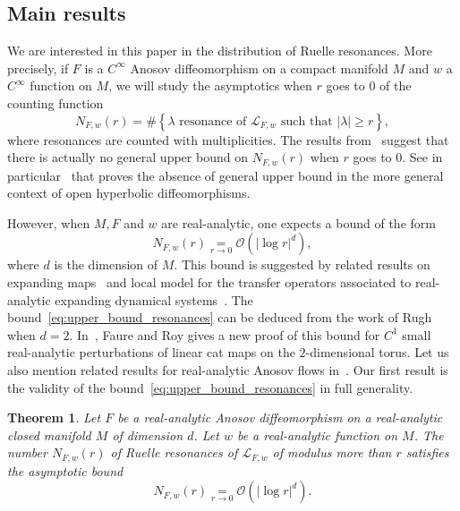 \documentclass[10pt]{amsart}
\newtheorem{theo}{Theorem}[section]
\theoremstyle{definition}\newtheorem{defi}[theo]{Definition}\newtheorem{rema}[theo]{Remark}\newtheorem{exam}[theo]{Example}\newtheorem{exem}[theo]{Example}\newtheorem{nota}[theo]{Notation}
\newcommand{\set}[1]{\left\{ #1 \right\}}
\newcommand{\p}[1]{\left(#1\right)}
\newcommand{\va}[1]{\left|#1\right|}
\newcommand{\clO}{\mathcal{O}}
\newcommand{\clL}{\mathcal{L}}
\begin{document}
\subsection{Main results}

We are interested in this paper in the distribution of Ruelle resonances. More precisely, if $F$ is a $C^\infty$ Anosov diffeomorphism on a compact manifold $M$ and $w$ a $C^\infty$ function on $M$, we will study the asymptotics when $r$ goes to $0$ of the counting function
\begin{equation*}
N_{F,w}(r) = \# \set{ \lambda \text{ resonance of } \clL_{F,w} \text{ such that } \va{\lambda} \geq r},
\end{equation*}
where resonances are counted with multiplicities. The results from~\cite{local_and_global} suggest that there is actually no general upper bound on $N_{F,w}(r)$ when $r$ goes to $0$. See in particular~\cite[Proposition~2.10]{local_and_global} that proves the absence of general upper bound in the more general context of open hyperbolic diffeomorphisms.

However, when $M,F$ and $w$ are real-analytic, one expects a bound of the form
\begin{equation}\label{eq:upper_bound_resonances}
N_{F,w}(r) \underset{r \to 0}{=} \clO\p{\va{\log r}^d},
\end{equation}
where $d$ is the dimension of $M$. This bound is suggested by related results on expanding maps~\cite{ bandtlow_naud,ruelle_zeta_expanding} and local model for the transfer operators associated to real-analytic expanding dynamical systems~\cite{naud_local}. The bound~\eqref{eq:upper_bound_resonances} can be deduced from the work of Rugh~\cite{rugh_correlation, rugh_fredholm_axiomA} when $d=2$. In~\cite[Theorem~7]{faure_roy}, Faure and Roy gives a new proof of this bound for $C^1$ small real-analytic perturbations of linear cat maps on the $2$-dimensional torus. Let us also mention related results for real-analytic Anosov flows in~\cite{fried_selberg,fried_zeta,BJ20}. Our first result is the validity of the bound~\eqref{eq:upper_bound_resonances} in full generality.


\begin{theo}\label{theorem:upper_bound_resonances}
Let $F$ be a real-analytic Anosov diffeomorphism on a real-analytic closed manifold $M$ of dimension $d$. Let $w$ be a real-analytic function on $M$. The number $N_{F,w}(r)$ of Ruelle resonances of $\clL_{F,w}$ of modulus more than $r$ satisfies the asymptotic bound
\begin{equation*}
N_{F,w}(r) \underset{r \to 0}{=} \clO\p{\va{\log r}^d}.
\end{equation*}
\end{theo}
\end{document}

